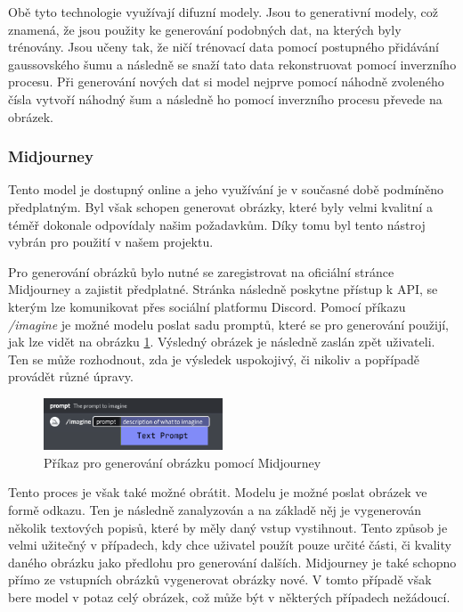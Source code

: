 Obě tyto technologie využívají difuzní modely. Jsou to generativní modely, což znamená, že jsou použity ke generování podobných dat, na kterých byly trénovány. Jsou učeny tak, že ničí trénovací data pomocí postupného přidávání gaussovského šumu a následně se snaží tato data rekonstruovat pomocí inverzního procesu. Při generování nových dat si model nejprve pomocí náhodně zvoleného čísla vytvoří náhodný šum a následně ho pomocí inverzního procesu převede na obrázek.

\subsubsection*{Midjourney}
Tento model je dostupný online a jeho využívání je v současné době podmíněno předplatným. Byl však schopen generovat obrázky, které byly velmi kvalitní a téměř dokonale odpovídaly našim požadavkům. Díky tomu byl tento nástroj vybrán pro použití v našem projektu.

Pro generování obrázků bylo nutné se zaregistrovat na oficiální stránce Midjourney a zajistit předplatné. Stránka následně poskytne přístup k API, se kterým lze komunikovat přes sociální platformu Discord. Pomocí příkazu \textit{/imagine} je možné modelu poslat sadu promptů, které se pro generování použijí, jak lze vidět na obrázku \ref{fig:mj_prompts}. Výsledný obrázek je následně zaslán zpět uživateli. Ten se může rozhodnout, zda je výsledek uspokojivý, či nikoliv a popřípadě provádět různé úpravy.

\begin{figure}[H]
    \centering
    \includegraphics[width=0.475\textwidth]{resources/figures/midjourney_prompts.png}
    \caption{Příkaz pro generování obrázku pomocí Midjourney\cite{midjourney}}
    \label{fig:mj_prompts}
\end{figure}

Tento proces je však také možné obrátit. Modelu je možné poslat obrázek ve formě odkazu. Ten je následně zanalyzován a na základě něj je vygenerován několik textových popisů, které by měly daný vstup vystihnout. Tento způsob je velmi užitečný v případech, kdy chce uživatel použít pouze určité části, či kvality daného obrázku jako předlohu pro generování dalších. Midjourney je také schopno přímo ze vstupních obrázků vygenerovat obrázky nové. V tomto případě však bere model v potaz celý obrázek, což může být v některých případech nežádoucí.

